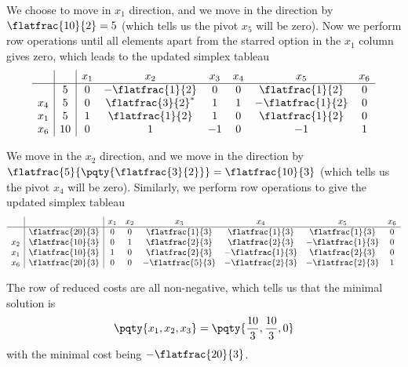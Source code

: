 \begin{example}
    We choose to move in \(x_1\) direction, and we move in the direction by \(\flatfrac{10}{2} = 5\) (which tells us the pivot \(x_5\) will be zero). Now we perform row operations until all elements apart from the starred option in the \(x_1\) column gives zero, which leads to the updated simplex tableau
    \[
        \begin{array}{c|c|cccccc}
            &   & x_1 & x_2 & x_3 & x_4 & x_5 & x_6 \\
        \hline
            & 5 & 0 & -\flatfrac{1}{2} & 0 & 0 & \flatfrac{1}{2} & 0 \\
        x_4 & 5 & 0 & \flatfrac{3}{2}^{\ast} & 1 & 1 & -\flatfrac{1}{2} & 0 \\
        x_1 & 5 & 1 & \flatfrac{1}{2} & 1 & 0 & \flatfrac{1}{2} & 0 \\
        x_6 & 10 & 0 & 1 & -1 & 0 & -1 & 1 \\
        \end{array}
    \]

    We move in the \(x_2\) direction, and we move in the direction by \(\flatfrac{5}{\pqty{\flatfrac{3}{2}}} = \flatfrac{10}{3}\) (which tells us the pivot \(x_4\) will be zero). Similarly, we perform row operations to give the updated simplex tableau
    \[
        \begin{array}{c|c|cccccc}
            &   & x_1 & x_2 & x_3 & x_4 & x_5 & x_6 \\
        \hline
            & \flatfrac{20}{3} & 0 & 0 & \flatfrac{1}{3} & \flatfrac{1}{3} & \flatfrac{1}{3} & 0 \\
        x_2 & \flatfrac{10}{3} & 0 & 1 & \flatfrac{2}{3} & \flatfrac{2}{3} & -\flatfrac{1}{3} & 0 \\
        x_1 & \flatfrac{10}{3} & 1 & 0 & \flatfrac{2}{3} & -\flatfrac{1}{3} & \flatfrac{2}{3} & 0 \\
        x_6 & \flatfrac{20}{3} & 0 & 0 & -\flatfrac{5}{3} & -\flatfrac{2}{3} & -\flatfrac{2}{3} & 1 \\
        \end{array}
    \]

    The row of reduced costs are all non-negative, which tells us that the minimal solution is
    \[
        \pqty{x_1, x_2, x_3} = \pqty{\frac{10}{3}, \frac{10}{3}, 0}
    \]
    with the minimal cost being \(-\flatfrac{20}{3}\).
\end{example}